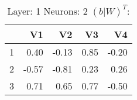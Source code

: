 \begin{table}[ht]
\centering
\begin{tabular}{rrrrr}
  \hline
 & V1 & V2 & V3 & V4 \\ 
  \hline
1 & 0.40 & -0.13 & 0.85 & -0.20 \\ 
  2 & -0.57 & -0.81 & 0.23 & 0.26 \\ 
  3 & 0.71 & 0.65 & 0.77 & -0.50 \\ 
   \hline
\end{tabular}
\caption{Layer: 1 Neurons: 2  $(b|W)^T$: 
} 
\end{table}
